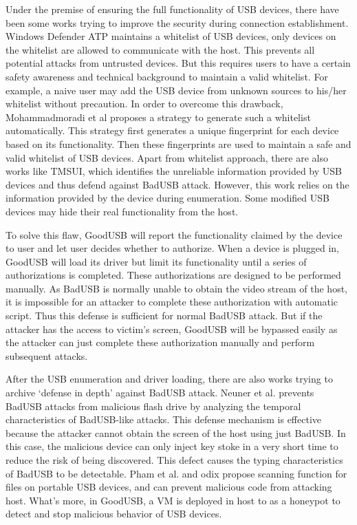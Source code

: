 Under the premise of ensuring the full functionality of USB devices, there have been some works trying to improve the security during connection establishment.
Windows Defender ATP\cite{windenfenderwhite} maintains a whitelist of USB devices, only devices on the whitelist are allowed to communicate with the host. This prevents all potential attacks from untrusted devices. But this requires users to have a certain safety awareness and technical background to maintain a valid whitelist. For example, a naive user may add the USB device from unknown sources to his/her whitelist without precaution. In order to overcome this drawback, Mohammadmoradi et al\cite{mohammadmoradi2018making} proposes a strategy to generate such a whitelist automatically. This strategy first generates a unique fingerprint for each device based on its functionality. Then these fingerprints are used to maintain a safe and valid whitelist of USB devices. Apart from whitelist approach, there are also works like TMSUI\cite{yang2015tmsui}, which identifies the unreliable information provided by USB devices and thus defend against BadUSB attack. However, this work relies on the information provided by the device during enumeration. Some modified USB devices may hide their real functionality from the host.

To solve this flaw, GoodUSB\cite{tian2015defending} will report the functionality claimed by the device to user and let user decides whether to authorize. When a device is plugged in, GoodUSB will load its driver but limit its functionality until a series of authorizations is completed. These authorizations are designed to be performed manually. As BadUSB is normally unable to obtain the video stream of the host, it is impossible for an attacker to complete these authorization with automatic script. Thus this defense is sufficient for normal BadUSB attack. But if the attacker has the access to victim's screen, GoodUSB will be bypassed easily as the attacker can just complete these authorization manually and perform subsequent attacks.

After the USB enumeration and driver loading, there are also works trying to archive `defense in depth' against BadUSB attack.
Neuner et al.\cite{neuner2018usblock} prevents BadUSB attacks from malicious flash drive by analyzing the temporal characteristics of BadUSB-like attacks. This defense mechanism is effective because the attacker cannot obtain the screen of the host using just BadUSB. In this case, the malicious device can only inject key stoke in a very short time to reduce the risk of being discovered. This defect causes the typing characteristics of BadUSB to be detectable.  Pham et al. \cite{pham2010optimizing} and odix\cite{OLEA} propose scanning function for files on portable USB devices, and can prevent malicious code from attacking host. What's more, in GoodUSB, a VM is deployed in host to as a honeypot to detect and stop malicious behavior of USB devices. 

